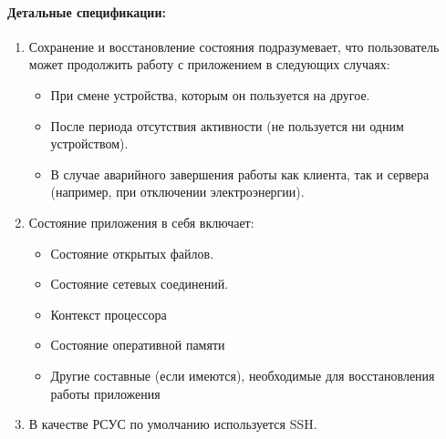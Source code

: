 \paragraph*{Детальные спецификации:}
\begin{enumerate}[label={\bfseries ДС-\arabic*}]
   \item Сохранение и восстановление состояния подразумевает, что пользователь может продолжить работу с приложением в следующих случаях:
         \begin{itemize}
            \item При смене устройства, которым он пользуется на другое.
            \item После периода отсутствия активности (не пользуется ни одним устройством).
            \item В случае аварийного завершения работы как клиента, так и сервера (например, при отключении электроэнергии).
         \end{itemize}
         \label{DS-appstate_switch}
   \item Состояние приложения в себя включает:
         \begin{itemize}
            \item Состояние открытых файлов.
            \item Состояние сетевых соединений.
            \item Контекст процессора
            \item Состояние оперативной памяти
            \item Другие составные (если имеются), необходимые для восстановления работы приложения
         \end{itemize}
   \item В качестве РСУС по умолчанию используется SSH. \label{DS-remote_access_default}
\end{enumerate}



